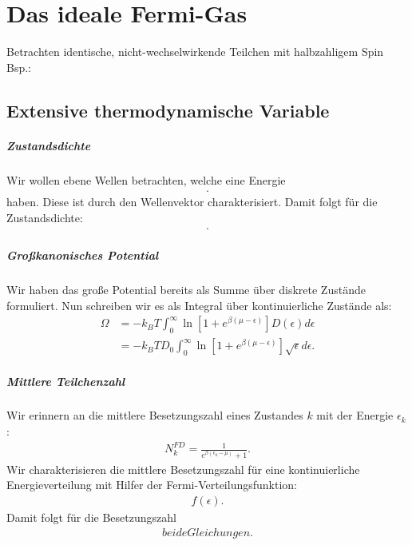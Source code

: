 \chapter{Das ideale Fermi-Gas}
Betrachten identische, nicht-wechselwirkende Teilchen mit halbzahligem Spin 
Bsp.:
\section{Extensive thermodynamische Variable}
\paragraph*{Zustandsdichte}
Wir wollen ebene Wellen betrachten, welche eine Energie 
\begin{align*}
    .
\end{align*}
haben. Diese ist durch den Wellenvektor charakterisiert. Damit folgt für die Zustandsdichte:
\begin{align*}
    .
\end{align*}
\paragraph*{Großkanonisches Potential} Wir haben das große Potential bereits als Summe über diskrete Zustände formuliert.  Nun schreiben wir es als Integral über kontinuierliche Zustände als:
\begin{align*}
    \Omega&=-k_B T \int_0^\infty \ln \left[1+e^{\beta (\mu - \epsilon)}\right]D(\epsilon)d\epsilon\\
    &=-k_B T D_0 \int_0^\infty \ln \left[1+e^{\beta (\mu - \epsilon)}\right]\sqrt{\epsilon}d\epsilon.
\end{align*}
\paragraph*{Mittlere Teilchenzahl} Wir erinnern an die mittlere Besetzungszahl eines Zustandes $k$ mit der Energie $\epsilon_k$:
\begin{align*}
    N_k^{FD}=\frac{1}{e^{\beta(\epsilon_k-\mu)}+1}.
\end{align*}
Wir charakterisieren die mittlere Besetzungszahl für eine kontinuierliche Energieverteilung mit Hilfer der Fermi-Verteilungsfunktion:
\begin{align*}
    f(\epsilon).
\end{align*}
Damit folgt für die Besetzungszahl
\begin{align*}
    beide Gleichungen .
\end{align*}
